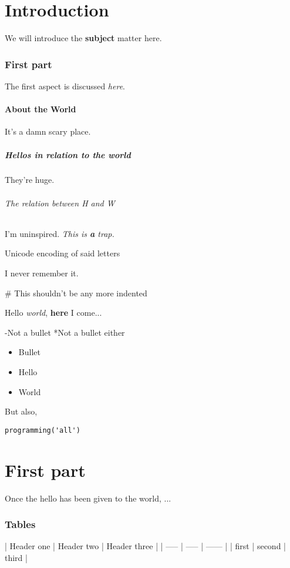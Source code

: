 \documentclass{article}
\begin{document}
\part*{Introduction}

We will introduce the \textbf{subject} matter here.

\section*{First part}

The first aspect is discussed \textit{here}.

\subsection*{About the World}

It's a damn scary place.

\subsubsection*{Hellos in relation to the world}

They're huge.

\paragraph{The relation between H and W}\mbox{}\newline

I'm uninspired. \textit{This is \textbf{a} trap.}

\subparagraph{Unicode encoding of said letters}\mbox{}\newline

I never remember it.

\subparagraph{\# This shouldn't be any more indented}\mbox{}\newline

Hello \textit{world}, \textbf{here} I come...

-Not a bullet
*Not a bullet either

\begin{itemize}
\item  Bullet
\item  Hello
\item  World

\end{itemize}

But also,


\begin{verbatim}
programming('all')
\end{verbatim}


\part*{First part}

Once the hello has been given to the world, ...

\section*{Tables}

| Header one | Header two | Header three |
| ----- | ----- | ------ |
| first | second | third |
\end{document}
